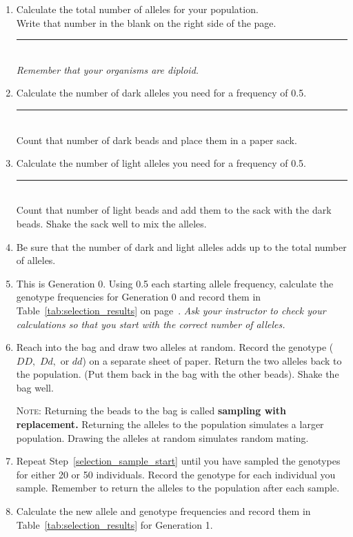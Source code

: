 \documentclass[12pt]{exam}
\newcommand{\allele}[1]{$#1$}
\begin{document}
\begin{enumerate}[resume]
	
	\item Calculate the total number of alleles for your population.\\
	Write that number in the blank on the right side of the page. 
	\hfill \rule{0.5in}{0.4pt}\\ \emph{Remember that your
		organisms are diploid.} 
	
	\item Calculate the number of dark alleles you need for a frequency of 0.5. 
	\hfill \rule{0.5in}{0.4pt} \\ Count that number of dark beads and place 
	them in a paper sack. 
	
	\item Calculate the number of light alleles you need for a frequency of 0.5.
	\hfill \rule{0.5in}{0.4pt} \\ Count that number of light beads and add 
	them to the sack with the dark beads. Shake the sack well to mix the alleles.
	
	\item Be sure that the number of dark and light alleles adds up to the 
	total number of alleles.
	
	\item This is Generation 0. Using 0.5 each starting allele frequency, 
	calculate the genotype frequencies for Generation 0 and record them in 
	Table~\ref{tab:selection_results} on page~\pageref{tab:selection_results}. 
	\emph{Ask your instructor to check your calculations so that you start with 
		the correct number of alleles.}
	
	\item \label{selection_sample_start} Reach into the bag and draw two alleles 
	at random. Record the genotype (\allele{DD,} \allele{Dd,} or \allele{dd}) on 
	a separate sheet of paper. Return the two alleles back to the population. 
	(Put them back in the bag with the other beads). Shake the bag well.
	
	\textsc{Note:} Returning the beads to the bag is called \textbf{sampling with replacement.} 
	Returning the alleles to the population simulates a larger population. Drawing 
	the alleles at random simulates random mating.
	
	\item Repeat Step~\ref{selection_sample_start} until you have sampled the genotypes 
	for either 20 or 50 individuals. Record the genotype for each individual you sample. 
	Remember to return the alleles to the population after each sample. 
	
	\item Calculate the new allele and genotype frequencies and record them in 
	Table~\ref{tab:selection_results} for Generation 1. 
	
\end{enumerate}
\end{document}
